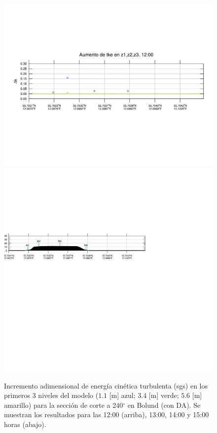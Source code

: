 \begin{figure}[H]
	\includegraphics[width=0.90\linewidth,trim={12mm 84mm 10mm 74mm},page=37,clip]{Imagenes/06/bol_da/delta_tke}\\%
	\includegraphics[width=0.90\linewidth,trim={-13.3mm 193mm 115mm 112mm},clip]{Imagenes/06/bol_da/cross_height}\\%
	\caption{Incremento adimensional de energía cinética turbulenta (sgs) en los primeros 3 niveles del modelo ($1.1$ [m] azul; $3.4$ [m] verde; $5.6$ [m] amarillo) para la sección de corte a 240$^\circ$ en Bolund (con DA). Se muestran los resultados para las 12:00 (arriba), 13:00, 14:00 y 15:00 horas (abajo).}
	\label{fig:06_bol_da_tke}
\end{figure}
